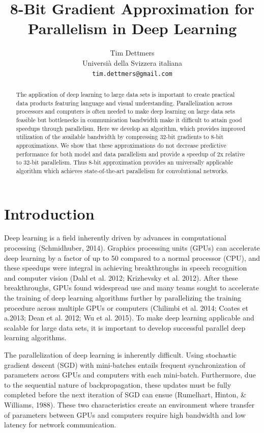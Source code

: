 \documentclass{article} %
\title{8-Bit Gradient Approximation for Parallelism in Deep Learning}
\author{
Tim Dettmers \\
Universià della Svizzera italiana \\
\texttt{tim.dettmers@gmail.com} }
\begin{document}
\maketitle

\begin{abstract} The application of deep learning to large data sets is important to create practical data products featuring language and visual understanding. Parallelization across processors and computers is often needed to make deep learning on large data sets feasible but bottlenecks in communication bandwidth make it difficult to attain good speedups through parallelism. Here we develop an algorithm, which provides improved utilization of the available bandwidth by compressing 32-bit gradients to 8-bit approximations. We show that these approximations do not decrease predictive performance for both model and data parallelism and provide a speedup of 2x relative to 32-bit parallelism. Thus 8-bit approximation provides an universally applicable algorithm which achieves state-of-the-art parallelism for convolutional networks.
\end{abstract}

\section{Introduction}
Deep learning is a field inherently driven by advances in computational processing (Schmidhuber, 2014). Graphics processing units (GPUs) can accelerate deep learning by a factor of up to 50 compared to a normal processor (CPU), and these speedups were integral in achieving breakthroughs in speech recognition and computer vision (Dahl et al. 2012; Krizhevsky et al. 2012). After these breakthroughs, GPUs found widespread use and many teams sought to accelerate the training of deep learning algorithms further by parallelizing the training procedure across multiple GPUs or computers (Chilimbi et al. 2014; Coates et a.2013; Dean et al. 2012; Wu et al. 2015). To make deep learning applicable and scalable for large data sets, it is important to develop successful parallel deep learning algorithms.

The parallelization of deep learning is inherently difficult. Using stochastic gradient descent (SGD) with mini-batches entails frequent synchronization of parameters across GPUs and computers with each mini-batch. Furthermore, due to the sequential nature of backpropagation, these updates must be fully completed before the next iteration of SGD can ensue (Rumelhart, Hinton, \& Williams, 1988). These two characteristics create an environment where transfer of parameters between GPUs and computers require high bandwidth and low latency for network communication. 
\end{document}
